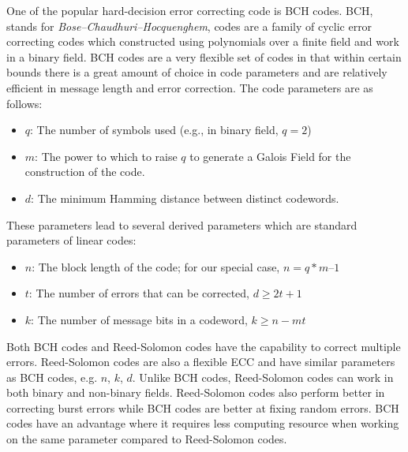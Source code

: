 One of the popular hard-decision error correcting code is BCH codes. BCH, stands for \textit{Bose–Chaudhuri–Hocquenghem}, codes are a family of cyclic error correcting codes which constructed using polynomials over a finite field and work in a binary field.
BCH codes are a very flexible set of codes in that within certain bounds there is a great amount of choice in code parameters and are relatively efficient in message length and error correction. The code parameters are as follows:
\begin{itemize}
\item $q$: The number of symbols used (e.g., in binary field, $q = 2$)
\item $m$: The power to which to raise $q$ to generate a Galois Field for the construction of the code.
\item $d$: The minimum Hamming distance between distinct codewords.
\end{itemize}

These parameters lead to several derived parameters which are standard parameters of linear codes:
\begin{itemize}
\item $n$: The block length of the code; for our special case, $n = q*m – 1$
\item $t$: The number of errors that can be corrected, $d \geq 2t + 1$
\item $k$: The number of message bits in a codeword, $k \geq n - mt$
\end{itemize}

Both BCH codes and Reed-Solomon codes have the capability to correct multiple errors. Reed-Solomon codes are also a flexible ECC and have similar parameters as BCH codes, e.g. $n$, $k$, $d$.  Unlike BCH codes, Reed-Solomon codes can work in both binary and non-binary fields. Reed-Solomon codes also perform better in correcting burst errors while BCH codes are better at fixing random errors. BCH codes have an advantage where it requires less computing resource when working on the same parameter compared to Reed-Solomon codes.


